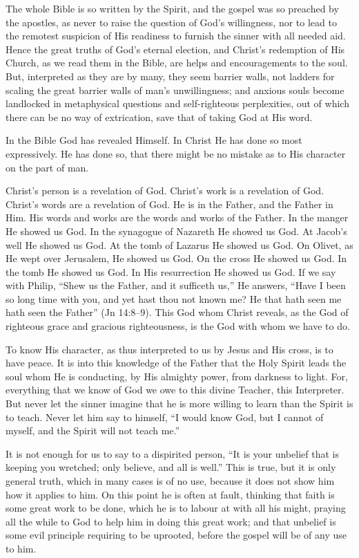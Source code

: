 \documentclass[
]{book}
\begin{document}
The whole Bible is so written by the Spirit, and the gospel was so preached by the apostles, as never to raise the question of God's willingness, nor to lead to the remotest suspicion of His readiness to furnish the sinner with all needed aid. Hence the great truths of God's eternal election, and Christ's redemption of His Church, as we read them in the Bible, are helps and encouragements to the soul. But, interpreted as they are by many, they seem barrier walls, not ladders for scaling the great barrier walls of man's unwillingness; and anxious souls become landlocked in metaphysical questions and self-righteous perplexities, out of which there can be no way of extrication, save that of taking God at His word.

In the Bible God has revealed Himself. In Christ He has done so most expressively. He has done so, that there might be no mistake as to His character on the part of man.

Christ's person is a revelation of God. Christ's work is a revelation of God. Christ's words are a revelation of God. He is in the Father, and the Father in Him. His words and works are the words and works of the Father. In the manger He showed us God. In the synagogue of Nazareth He showed us God. At Jacob's well He showed us God. At the tomb of Lazarus He showed us God. On Olivet, as He wept over Jerusalem, He showed us God. On the cross He showed us God. In the tomb He showed us God. In His resurrection He showed us God. If we say with Philip, ``Shew us the Father, and it sufficeth us,'' He answers, ``Have I been so long time with you, and yet hast thou not known me? He that hath seen me hath seen the Father'' (Jn 14:8--9). This God whom Christ reveals, as the God of righteous grace and gracious righteousness, is the God with whom we have to do.

To know His character, as thus interpreted to us by Jesus and His cross, is to have peace. It is into this knowledge of the Father that the Holy Spirit leads the soul whom He is conducting, by His almighty power, from darkness to light. For, everything that we know of God we owe to this divine Teacher, this Interpreter. But never let the sinner imagine that he is more willing to learn than the Spirit is to teach. Never let him say to himself, ``I would know God, but I cannot of myself, and the Spirit will not teach me.''

It is not enough for us to say to a dispirited person, ``It is your unbelief that is keeping you wretched; only believe, and all is well.'' This is true, but it is only general truth, which in many cases is of no use, because it does not show him how it applies to him. On this point he is often at fault, thinking that faith is some great work to be done, which he is to labour at with all his might, praying all the while to God to help him in doing this great work; and that unbelief is some evil principle requiring to be uprooted, before the gospel will be of any use to him.
\end{document}
